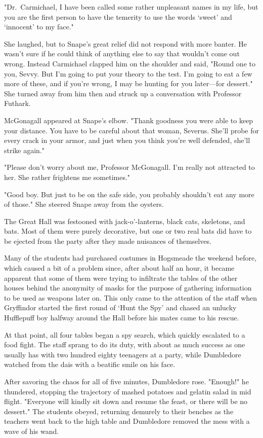 "Dr.~Carmichael, I have been called some rather unpleasant names in my life, but you are the first person to have the temerity to use the words `sweet' and `innocent' to my face."

She laughed, but to Snape's great relief did not respond with more banter. He wasn't sure if he could think of anything else to say that wouldn't come out wrong. Instead Carmichael clapped him on the shoulder and said, "Round one to you, Sevvy. But I'm going to put your theory to the test. I'm going to eat a few more of these, and if you're wrong, I may be hunting for you later—for dessert." She turned away from him then and struck up a conversation with Professor Futhark.

McGonagall appeared at Snape's elbow. "Thank goodness you were able to keep your distance. You have to be careful about that woman, Severus. She'll probe for every crack in your armor, and just when you think you're well defended, she'll strike again."

"Please don't worry about me, Professor McGonagall. I'm really not attracted to her. She rather frightens me sometimes."

"Good boy. But just to be on the safe side, you probably shouldn't eat any more of those." She steered Snape away from the oysters.

The Great Hall was festooned with jack-o'-lanterns, black cats, skeletons, and bats. Most of them were purely decorative, but one or two real bats did have to be ejected from the party after they made nuisances of themselves.

Many of the students had purchased costumes in Hogsmeade the weekend before, which caused a bit of a problem since, after about half an hour, it became apparent that some of them were trying to infiltrate the tables of the other houses behind the anonymity of masks for the purpose of gathering information to be used as weapons later on. This only came to the attention of the staff when Gryffindor started the first round of `Hunt the Spy' and chased an unlucky Hufflepuff boy halfway around the Hall before his mates came to his rescue.

At that point, all four tables began a spy search, which quickly escalated to a food fight. The staff sprang to do its duty, with about as much success as one usually has with two hundred eighty teenagers at a party, while Dumbledore watched from the dais with a beatific smile on his face.

After savoring the chaos for all of five minutes, Dumbledore rose. "Enough!" he thundered, stopping the trajectory of mashed potatoes and gelatin salad in mid flight. "Everyone will kindly sit down and resume the feast, or there will be no dessert." The students obeyed, returning demurely to their benches as the teachers went back to the high table and Dumbledore removed the mess with a wave of his wand.

